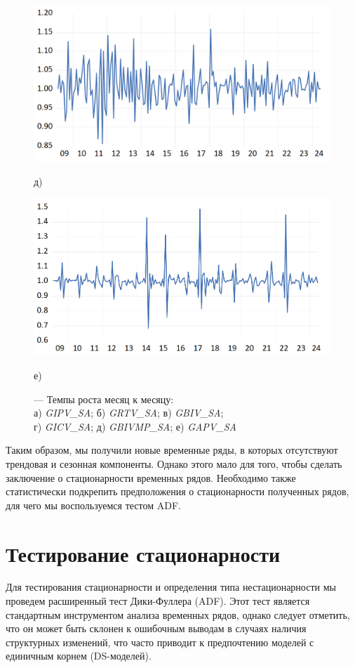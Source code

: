 \documentclass[a4paper, 14pt]{extreport}
\numberwithin{equation}{subsection}
\numberwithin{equation}{section}
\begin{document}
\begin{figure}
		\begin{minipage}{0.5\textwidth}
			\centering
		\includegraphics[scale=0.25]{images/img13}
			\caption*{д)}
		\end{minipage}%
		\hfill %
		\begin{minipage}{0.5\textwidth}
			\centering
		\includegraphics[scale=0.25]{images/img14}
			\caption*{е)}
		\end{minipage}
		\caption{\centering --- Темпы роста месяц к месяцу:\\ а) \textit{GIPV\_SA}; б) \textit{GRTV\_SA}; в) \textit{GBIV\_SA};\\ г) \textit{GICV\_SA}; д) \textit{GBIVMP\_SA}; е) \textit{GAPV\_SA}}
		\label{fig:gsa}
	\end{figure}
	
	Таким образом, мы получили новые временные ряды, в которых отсутствуют трендовая и сезонная компоненты. Однако этого мало для того, чтобы сделать заключение о стационарности временных рядов. Необходимо также статистически подкрепить предположения о стационарности полученных рядов, для чего мы воспользуемся тестом ADF.
	
	\section{Тестирование стационарности}
	Для тестирования стационарности и определения типа нестационарности мы проведем расширенный тест Дики-Фуллера (ADF). Этот тест является стандартным инструментом анализа временных рядов, однако следует отметить, что он может быть склонен к ошибочным выводам в случаях наличия структурных изменений, что часто приводит к предпочтению моделей с единичным корнем (DS-моделей).
	
\end{document}
